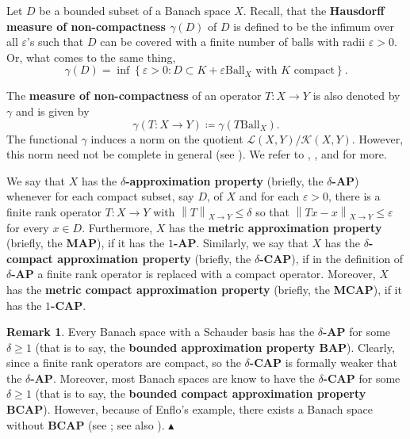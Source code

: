 \documentclass[11pt]{amsart}
\theoremstyle{definition}
\theoremstyle{definition}
\theoremstyle{definition}
\theoremstyle{definition}
\theoremstyle{definition}
\theoremstyle{definition}
\newtheorem{remark}[theorem]{Remark}
\theoremstyle{definition}
\theoremstyle{definition}
\numberwithin{equation}{section}
\numberwithin{equation}{section}
\numberwithin{equation}{section}
\theoremstyle{definition}
\theoremstyle{definition}
\theoremstyle{definition}
\theoremstyle{definition}
\theoremstyle{definition}
\theoremstyle{definition}
\newcommand{\norm}[1]{\left\lVert#1\right\rVert}
\newcommand\xqed[1]{%
	\leavevmode\unskip\penalty9999 \hbox{}\nobreak\hfill
	\quad\hbox{#1}}
\newcommand\demo{\xqed{{\Large $\blacktriangle$}}}
\begin{document}
Let $D$ be a bounded subset of a Banach space $X$. Recall, that the {\bf Hausdorff measure of non-compactness $\gamma(D)$} of $D$ is defined to be
the infimum over all $\varepsilon$'s such that $D$ can be covered with a finite number of balls with radii $\varepsilon > 0$.
Or, what comes to the same thing,
\begin{equation*}
	\gamma(D) = \inf \left\{ \varepsilon > 0 \colon D \subset K + \varepsilon\text{Ball}_X \text{ with } K \text{ compact} \right\}.
\end{equation*}

The {\bf measure of non-compactness} of an operator $T \colon X \rightarrow Y$ is also denoted by $\gamma$ and is given by
\begin{equation*}
	\gamma(T \colon X \rightarrow Y) \coloneqq \gamma(T\text{Ball}_X).
\end{equation*}
The functional $\gamma$ induces a norm on the quotient $\mathscr{L}(X,Y)/\mathscr{K}(X,Y)$.
However, this norm need not be complete in general (see \cite[Theorem~2.5]{AT87}).
We refer to \cite{BG79}, \cite{Dil87}, \cite{LS71} and \cite{PS88} for more.

We say that $X$ has the {\bf $\delta$-approximation property} (briefly, the {\bf $\delta$-AP}) whenever for each compact subset, say $D$,
of $X$ and for each $\varepsilon > 0$, there is a finite rank operator $T \colon X \rightarrow Y$ with $\norm{T}_{X \rightarrow Y} \leqslant \delta$
so that $\norm{Tx - x}_{X \rightarrow Y} \leqslant \varepsilon$ for every $x \in D$.
Furthermore, $X$ has the {\bf metric approximation property} (briefly, the {\bf MAP}), if it has the {\bf $1$-AP}.
Similarly, we say that $X$ has the {\bf $\delta$-compact approximation property} (briefly, the {\bf $\delta$-CAP}),
if in the definition of {\bf $\delta$-AP} a finite rank operator is replaced with a compact operator.
Moreover, $X$ has the {\bf metric compact approximation property} (briefly, the {\bf MCAP}), if it has the {\bf $1$-CAP}.

\begin{remark}
	Every Banach space with a Schauder basis has the {\bf $\delta$-AP} for some $\delta \geqslant 1$ (that is to say, the {\bf bounded approximation property BAP}).
	Clearly, since a finite rank operators are compact, so the {\bf $\delta$-CAP} is formally weaker that the {\bf $\delta$-AP}.
	Moreover, most Banach spaces are know to have the {\bf $\delta$-CAP} for some $\delta \geqslant 1$ (that is to say, the {\bf bounded compact approximation property BCAP}).
	However, because of Enflo's example, there exists a Banach space without {\bf BCAP} (see \cite{Enf73}; see also \cite[Theorem~1.e.7]{LT77}).
	\demo
\end{remark}
\end{document}
